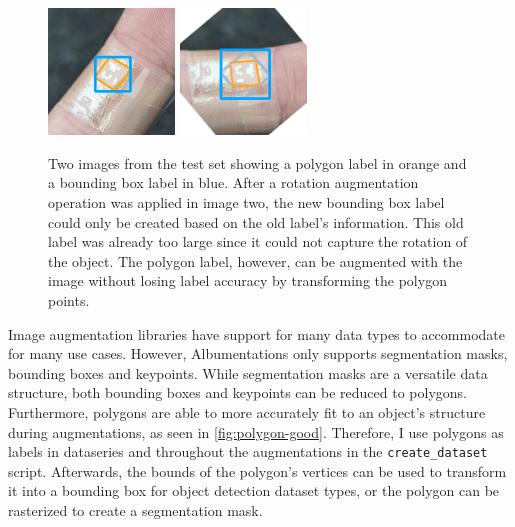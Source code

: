 \documentclass[10pt]{book}
\newcommand{\figureref}[1]{\autoref{#1}}
\begin{document}
\begin{figure}
  \centering
     {\includegraphics[width=0.3\textwidth]{image/polygon_pog_1}}
     {\includegraphics[width=0.3\textwidth]{image/polygon_pog_2}}
  \caption{Two images from the test set showing a polygon label in orange and a bounding box label in blue. After a rotation augmentation operation was applied in image two, the new bounding box label could only be created based on the old label's information. This old label was already too large since it could not capture the rotation of the object. The polygon label, however, can be augmented with the image without losing label accuracy by transforming the polygon points.}
  \label{fig:polygon-good}
\end{figure}

Image augmentation libraries have support for many data types to accommodate for many use cases. However, Albumentations only supports segmentation masks, bounding boxes and keypoints. While segmentation masks are a versatile data structure, both bounding boxes and keypoints can be reduced to polygons. Furthermore, polygons are able to more accurately fit to an object's structure during augmentations, as seen in \figureref{fig:polygon-good}. Therefore, I use polygons as labels in dataseries and throughout the augmentations in the \texttt{create\_dataset} script. Afterwards, the bounds of the polygon's vertices can be used to transform it into a bounding box for object detection dataset types, or the polygon can be rasterized to create a segmentation mask.
\end{document}
